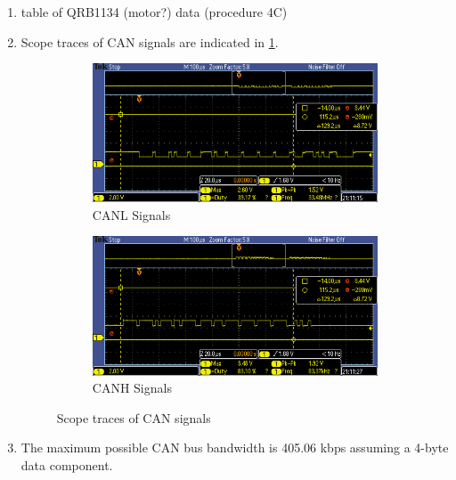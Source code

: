 \documentclass[12pt]{article}
\newcommand{\todo}[1]{{\color{red}{\LARGE TODO} #1}}
\begin{document}
\begin{enumerate}
\item \todo{table of QRB1134 (motor?) data (procedure 4C)}
\item Scope traces of CAN signals are indicated in
  \cref{fig:can-frames}.
\begin{figure}[H]
  \centering
  \begin{subfigure}[b]{0.45\textwidth}
    \includegraphics[width=\textwidth]{./img/TEK00008}
    \caption{CANL Signals}
  \end{subfigure}
  \begin{subfigure}[b]{0.45\textwidth}
    \includegraphics[width=\textwidth]{./img/TEK00009}
    \caption{CANH Signals}
  \end{subfigure}
  \caption{Scope traces of CAN signals}
  \label{fig:can-frames}
\end{figure}

\item The maximum possible CAN bus bandwidth is 405.06 kbps assuming a
  4-byte data component.
\end{enumerate}

\end{document}

